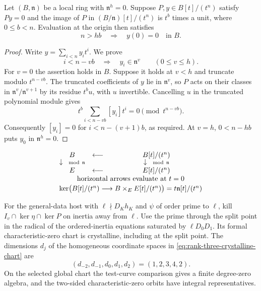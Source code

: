 \begin{auxlemma}\label{lem:crystalline-coefficient-test}
Let \((B,\mathfrak n)\) be a local ring with \(\mathfrak n^h=0\).
Suppose \(P,y\in B[t]/(t^n)\) satisfy \(Py=0\) and the image of \(P\)
in \((B/\mathfrak n)[t]/(t^n)\) is \(t^b\) times a unit, where
\(0\le b<n\). Evaluation at the origin then satisfies
\[
                       n>hb\quad\Longrightarrow\quad y(0)=0\quad\text{in }B .
\]
\end{auxlemma}
\begin{proof}
Write \(y=\sum_{i<n}y_i t^i\). We prove
\[
  i<n-vb\quad\Longrightarrow\quad y_i\in\mathfrak n^v
  \qquad(0\le v\le h).
\]
For \(v=0\) the assertion holds in \(B\). Suppose it holds at \(v<h\)
and truncate modulo \(t^{n-vb}\). The truncated coefficients of \(y\)
lie in \(\mathfrak n^v\), so \(P\) acts on their classes in
\(\mathfrak n^v/\mathfrak n^{v+1}\) by its residue \(t^b u\), with \(u\)
invertible. Cancelling \(u\) in the truncated polynomial module gives
\[
 t^b\sum_{i<n-vb}[y_i]t^i=0\pmod {t^{n-vb}}.
\]
Consequently \([y_i]=0\) for \(i<n-(v+1)b\), as required.
At \(v=h\), \(0<n-hb\) puts \(y_0\) in \(\mathfrak n^h=0\).
\end{proof}

\begin{construction}
\[
\begin{array}{ccc}
 B &\longleftarrow& B[t]/(t^n)\\[-2pt]
 \downarrow\ {\scriptstyle\bmod\,\mathfrak n}&&
    \downarrow\ {\scriptstyle\bmod\,\mathfrak n}\\
 E&\longleftarrow&E[t]/(t^n)\\
 \multicolumn{3}{c}{\text{horizontal arrows evaluate at }t=0}\\[2pt]
 \multicolumn{3}{c}{\ker\bigl(B[t]/(t^n)\longrightarrow
       B\times_E E[t]/(t^n)\bigr)=t\mathfrak n[t]/(t^n)}
\end{array}
\]
\caption{The test algebra joining the given point to the unramified curve. Evaluation and reduction have common target in the residue field. Formal smoothness lifts the compatible pair across the resulting nilpotent kernel.}\label{fig:crystalline-thickening-test}
\end{construction}

\begin{proposition}
\label{prop:rank-three-crystalline-local-base}
For the general-data host with \(\ell\nmid D_K h_K\) and
\(\psi\) of order prime to \(\ell\), kill
\(I_v\cap\ker\eta\cap\ker P\) on inertia away from \(\ell\).
Use the prime through
the split point in the radical of the ordered-inertia equations
saturated by \(\ell D_0D_1\). Its formal characteristic-zero chart is crystalline, including at
the split point. The dimensions \(d_j\) of the homogeneous coordinate
spaces in \eqref{eq:rank-three-crystalline-chart} are
\[
                (d_{-2},d_{-1},d_0,d_1,d_2)=(1,2,3,4,2).
\] On the selected global chart the test-curve
comparison gives a finite degree-zero algebra, and the
two-sided characteristic-zero orbits have integral representatives.
\end{proposition}

